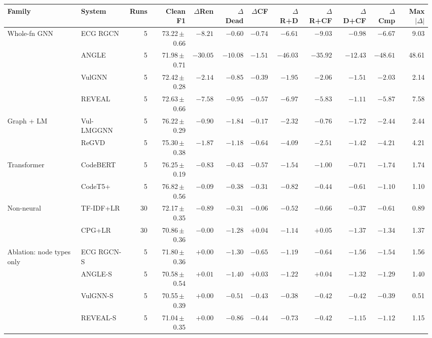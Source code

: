 \begin{tabular}{llrrrrrrrrrr}
\toprule
Family & System & Runs & Clean F1 & $\Delta$Ren & $\Delta$Dead & $\Delta$CF & $\Delta$R+D & $\Delta$R+CF & $\Delta$D+CF & $\Delta$Cmp & Max$|\Delta|$ \\
\midrule
Whole-fn GNN & ECG RGCN & 5 & 73.22\,$\pm$\,0.66 & $\mathbf{-8.21}$ & $-0.60$ & $-0.74$ & $\mathbf{-6.61}$ & $\mathbf{-9.03}$ & $\mathbf{-0.98}$ & $\mathbf{-6.67}$ & 9.03 \\
 & ANGLE & 5 & 71.98\,$\pm$\,0.71 & $\mathbf{-30.05}$ & $-10.08$ & $-1.51$ & $\mathbf{-46.03}$ & $\mathbf{-35.92}$ & $-12.43$ & $\mathbf{-48.61}$ & 48.61 \\
 & VulGNN & 5 & 72.42\,$\pm$\,0.28 & $\mathbf{-2.14}$ & $-0.85$ & $-0.39$ & $\mathbf{-1.95}$ & $\mathbf{-2.06}$ & $\mathbf{-1.51}$ & $\mathbf{-2.03}$ & 2.14 \\
 & REVEAL & 5 & 72.63\,$\pm$\,0.66 & $\mathbf{-7.58}$ & $\mathbf{-0.95}$ & $\mathbf{-0.57}$ & $\mathbf{-6.97}$ & $\mathbf{-5.83}$ & $\mathbf{-1.11}$ & $\mathbf{-5.87}$ & 7.58 \\
\midrule
Graph + LM & Vul-LMGGNN & 5 & 76.22\,$\pm$\,0.29 & $\mathbf{-0.90}$ & $\mathbf{-1.84}$ & $-0.17$ & $\mathbf{-2.32}$ & $\mathbf{-0.76}$ & $\mathbf{-1.72}$ & $\mathbf{-2.44}$ & 2.44 \\
 & ReGVD & 5 & 75.30\,$\pm$\,0.38 & $\mathbf{-1.87}$ & $\mathbf{-1.18}$ & $\mathbf{-0.64}$ & $\mathbf{-4.09}$ & $\mathbf{-2.51}$ & $\mathbf{-1.42}$ & $\mathbf{-4.21}$ & 4.21 \\
\midrule
Transformer & CodeBERT & 5 & 76.25\,$\pm$\,0.19 & $\mathbf{-0.83}$ & $\mathbf{-0.43}$ & $\mathbf{-0.57}$ & $\mathbf{-1.54}$ & $\mathbf{-1.00}$ & $\mathbf{-0.71}$ & $\mathbf{-1.74}$ & 1.74 \\
 & CodeT5+ & 5 & 76.82\,$\pm$\,0.56 & $-0.09$ & $-0.38$ & $-0.31$ & $\mathbf{-0.82}$ & $\mathbf{-0.44}$ & $-0.61$ & $\mathbf{-1.10}$ & 1.10 \\
\midrule
Non-neural & TF-IDF+LR & 30 & 72.17\,$\pm$\,0.35 & $-0.89$ & $-0.31$ & $-0.06$ & $-0.52$ & $-0.66$ & $-0.37$ & $-0.61$ & 0.89 \\
 & CPG+LR & 30 & 70.86\,$\pm$\,0.36 & $-0.00$ & $\mathbf{-1.28}$ & $+0.04$ & $\mathbf{-1.14}$ & $+0.05$ & $\mathbf{-1.37}$ & $\mathbf{-1.34}$ & 1.37 \\
\midrule
Ablation: node types only & ECG RGCN-S & 5 & 71.80\,$\pm$\,0.36 & $+0.00$ & $\mathbf{-1.30}$ & $-0.65$ & $\mathbf{-1.19}$ & $-0.64$ & $\mathbf{-1.56}$ & $\mathbf{-1.54}$ & 1.56 \\
 & ANGLE-S & 5 & 70.58\,$\pm$\,0.54 & $+0.01$ & $\mathbf{-1.40}$ & $+0.03$ & $\mathbf{-1.22}$ & $+0.04$ & $\mathbf{-1.32}$ & $\mathbf{-1.29}$ & 1.40 \\
 & VulGNN-S & 5 & 70.55\,$\pm$\,0.39 & $+0.00$ & $-0.51$ & $-0.43$ & $-0.38$ & $-0.42$ & $-0.42$ & $-0.39$ & 0.51 \\
 & REVEAL-S & 5 & 71.04\,$\pm$\,0.35 & $+0.00$ & $-0.86$ & $-0.44$ & $-0.73$ & $-0.42$ & $-1.15$ & $-1.12$ & 1.15 \\
\bottomrule
\end{tabular}
